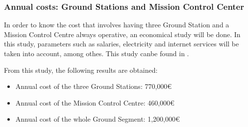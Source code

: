 \subsubsection{Annual costs: Ground Stations and Mission Control Center}
In order to know the cost that involves having three Ground Station and a Mission Control Centre always operative, an economical study will be done. In this study, parameters such as salaries, electricity and internet services will be taken into account, among othes. This study canbe found in \cite[Chapter 3, Section 2]{annex3}.

From this study, the following results are obtained:
\begin{itemize}
\item Annual cost of the three Ground Stations: 770,000\euro
\item Annual cost of the Mission Control Centre: 460,000\euro
\item Annual cost of the whole Ground Segment: 1,200,000\euro
\end{itemize}